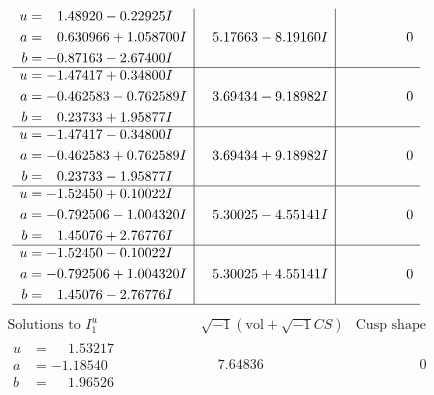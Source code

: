 \documentclass[1p]{elsarticle_modified}
\theoremstyle{definition}
\newcommand{\I}{\sqrt{-1}}
\begin{document}
$$\begin{array}{c|c|c}
\begin{aligned}
u &= \phantom{-}1.48920 - 0.22925 I \\
a &= \phantom{-}0.630966 + 1.058700 I \\
b &= -0.87163 - 2.67400 I\end{aligned}
 & \phantom{-}5.17663 - 8.19160 I & \phantom{-0.000000 } 0 \\ \hline\begin{aligned}
u &= -1.47417 + 0.34800 I \\
a &= -0.462583 - 0.762589 I \\
b &= \phantom{-}0.23733 + 1.95877 I\end{aligned}
 & \phantom{-}3.69434 - 9.18982 I & \phantom{-0.000000 } 0 \\ \hline\begin{aligned}
u &= -1.47417 - 0.34800 I \\
a &= -0.462583 + 0.762589 I \\
b &= \phantom{-}0.23733 - 1.95877 I\end{aligned}
 & \phantom{-}3.69434 + 9.18982 I & \phantom{-0.000000 } 0 \\ \hline\begin{aligned}
u &= -1.52450 + 0.10022 I \\
a &= -0.792506 - 1.004320 I \\
b &= \phantom{-}1.45076 + 2.76776 I\end{aligned}
 & \phantom{-}5.30025 - 4.55141 I & \phantom{-0.000000 } 0 \\ \hline\begin{aligned}
u &= -1.52450 - 0.10022 I \\
a &= -0.792506 + 1.004320 I \\
b &= \phantom{-}1.45076 - 2.76776 I\end{aligned}
 & \phantom{-}5.30025 + 4.55141 I & \phantom{-0.000000 } 0\\
 \hline 
 \end{array}$$\newpage$$\begin{array}{c|c|c}  
\text{Solutions to }I^u_{1}& \I (\text{vol} + \sqrt{-1}CS) & \text{Cusp shape}\\
 \hline 
\begin{aligned}
u &= \phantom{-}1.53217\phantom{ +0.000000I} \\
a &= -1.18540\phantom{ +0.000000I} \\
b &= \phantom{-}1.96526\phantom{ +0.000000I}\end{aligned}
 & \phantom{-}7.64836\phantom{ +0.000000I} & \phantom{-0.000000 } 0 \\ \hline\begin{aligned}

\end{aligned}
\end{array}$$
\end{document}
